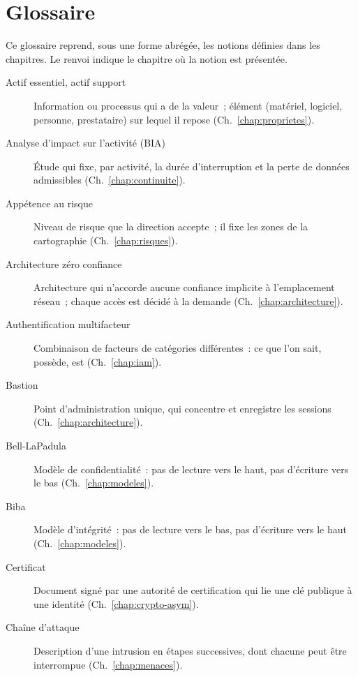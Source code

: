 
\chapter{Glossaire}
\label{ann:glossaire}

Ce glossaire reprend, sous une forme abrégée, les notions définies dans les
chapitres. Le renvoi indique le chapitre où la notion est présentée.

\begin{description}
    \item[Actif essentiel, actif support] Information ou processus qui a de la valeur~; élément (matériel, logiciel, personne, prestataire) sur lequel il repose (Ch.~\ref{chap:proprietes}).
    \item[Analyse d'impact sur l'activité (BIA)] Étude qui fixe, par activité, la durée d'interruption et la perte de données admissibles (Ch.~\ref{chap:continuite}).
    \item[Appétence au risque] Niveau de risque que la direction accepte~; il fixe les zones de la cartographie (Ch.~\ref{chap:risques}).
    \item[Architecture zéro confiance] Architecture qui n'accorde aucune confiance implicite à l'emplacement réseau~; chaque accès est décidé à la demande (Ch.~\ref{chap:architecture}).
    \item[Authentification multifacteur] Combinaison de facteurs de catégories différentes~: ce que l'on sait, possède, est (Ch.~\ref{chap:iam}).
    \item[Bastion] Point d'administration unique, qui concentre et enregistre les sessions (Ch.~\ref{chap:architecture}).
    \item[Bell-LaPadula] Modèle de confidentialité~: pas de lecture vers le haut, pas d'écriture vers le bas (Ch.~\ref{chap:modeles}).
    \item[Biba] Modèle d'intégrité~: pas de lecture vers le bas, pas d'écriture vers le haut (Ch.~\ref{chap:modeles}).
    \item[Certificat] Document signé par une autorité de certification qui lie une clé publique à une identité (Ch.~\ref{chap:crypto-asym}).
    \item[Chaîne d'attaque] Description d'une intrusion en étapes successives, dont chacune peut être interrompue (Ch.~\ref{chap:menaces}).

\end{description}
